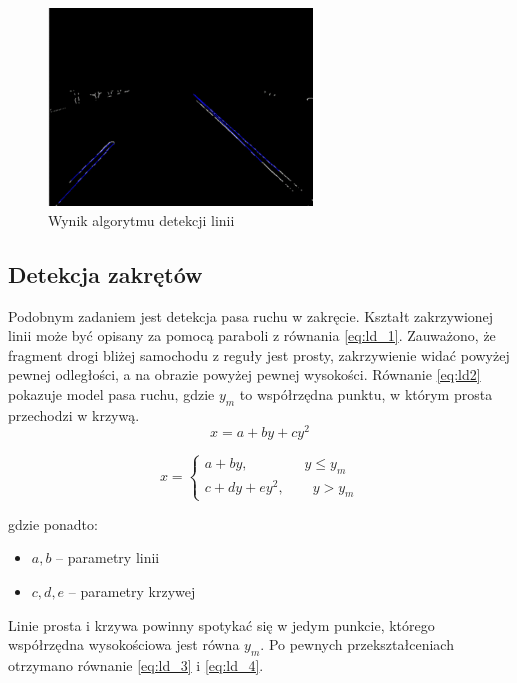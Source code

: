 \begin{figure}
  \centering
  \includegraphics[width=7cm]{img/prehough.png}
  \caption{Wynik algorytmu detekcji linii\cite{T3}}
  \label{fig:result}
\end{figure}

\subsection{Detekcja zakrętów}
Podobnym zadaniem jest detekcja pasa ruchu w zakręcie. Kształt zakrzywionej linii może być opisany za pomocą paraboli z równania \ref{eq:ld_1}. Zauważono, że fragment drogi bliżej samochodu z reguły jest prosty, zakrzywienie widać powyżej pewnej odległości, a na obrazie powyżej pewnej wysokości. Równanie \ref{eq:ld2} pokazuje model pasa ruchu, gdzie $y_m$ to współrzędna punktu, w którym prosta przechodzi w krzywą.
\begin{equation}
x=a+by+cy^{2}
\end{equation}

\begin{equation}
x=\begin{cases}
a+by,\qquad\qquad y\leq y_{m}\\ c+dy+ey^{2},\qquad y > y_{m} \end{cases}
\end{equation}

gdzie ponadto:
\begin{itemize}
\item $a,b$ -- parametry linii
\item $c,d,e$ -- parametry krzywej
\end{itemize}

Linie prosta i krzywa powinny spotykać się w jedym punkcie, którego współrzędna wysokościowa jest równa $y_m$. Po pewnych przekształceniach otrzymano równanie \ref{eq:ld_3} i \ref{eq:ld_4}.

